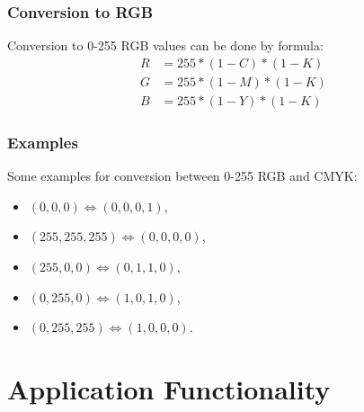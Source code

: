 \documentclass[titlepage]{article}
\begin{document}
\subsubsection{Conversion to RGB}
Conversion to 0-255 RGB values can be done by formula:
\begin{equation}
\begin{split}
R&=255*(1-C)*(1-K)\\
G&=255*(1-M)*(1-K)\\
B&=255*(1-Y)*(1-K)
\end{split}
\end{equation}

\subsubsection{Examples}
Some examples for conversion between 0-255 RGB and CMYK:
\begin{itemize}
  \item $(0, 0, 0) \Leftrightarrow (0, 0, 0, 1)$,
  \item $(255, 255, 255) \Leftrightarrow (0, 0, 0, 0)$,
  \item $(255, 0, 0) \Leftrightarrow (0, 1, 1, 0)$,
  \item $(0, 255, 0) \Leftrightarrow (1, 0, 1, 0)$,
  \item $(0, 255, 255) \Leftrightarrow (1, 0, 0, 0)$.
\end{itemize}

\section{Application Functionality}
\end{document}
